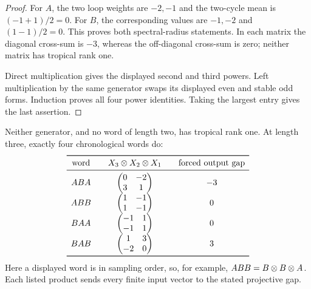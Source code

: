 \begin{proof}
For $A$, the two loop weights are $-2,-1$ and the two-cycle mean is
$(-1+1)/2=0$.  For $B$, the corresponding values are $-1,-2$ and
$(1-1)/2=0$.  This proves both spectral-radius statements.  In each matrix
the diagonal cross-sum is $-3$, whereas the off-diagonal cross-sum is zero;
neither matrix has tropical rank one.

Direct multiplication gives the displayed second and third powers.  Left
multiplication by the same generator swaps its displayed even and stable odd
forms.  Induction proves all four power identities.  Taking the largest
entry gives the last assertion.
\end{proof}

\begin{proposition}
\label{prop:reset-words}
Neither generator, and no word of length two, has tropical rank one.  At
length three, exactly four chronological words do:
\[
\begin{array}{c@{\qquad}c@{\qquad}c}
\toprule
\text{word}&X_3\trop X_2\trop X_1&
 \text{forced output gap}\\
\midrule
ABA&\begin{pmatrix}0&-2\\3&1\end{pmatrix}&-3\\[3pt]
ABB&\begin{pmatrix}1&-1\\1&-1\end{pmatrix}&0\\[3pt]
BAA&\begin{pmatrix}-1&1\\-1&1\end{pmatrix}&0\\[3pt]
BAB&\begin{pmatrix}1&3\\-2&0\end{pmatrix}&3\\
\bottomrule
\end{array}
\]
Here a displayed word is in sampling order, so, for example,
$ABB=B\otimes B\otimes A$.  Each listed product sends every finite input
vector to the stated projective gap.
\end{proposition}

